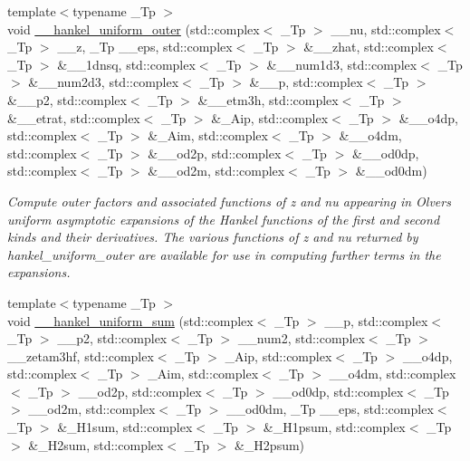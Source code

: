 \begin{DoxyCompactItemize}
{\footnotesize template$<$typename \+\_\+\+Tp $>$ }\\void \hyperlink{namespacestd_1_1____detail_a099751f2a153283d91f19d6efa52117a}{\+\_\+\+\_\+hankel\+\_\+uniform\+\_\+outer} (std\+::complex$<$ \+\_\+\+Tp $>$ \+\_\+\+\_\+nu, std\+::complex$<$ \+\_\+\+Tp $>$ \+\_\+\+\_\+z, \+\_\+\+Tp \+\_\+\+\_\+eps, std\+::complex$<$ \+\_\+\+Tp $>$ \&\+\_\+\+\_\+zhat, std\+::complex$<$ \+\_\+\+Tp $>$ \&\+\_\+\+\_\+1dnsq, std\+::complex$<$ \+\_\+\+Tp $>$ \&\+\_\+\+\_\+num1d3, std\+::complex$<$ \+\_\+\+Tp $>$ \&\+\_\+\+\_\+num2d3, std\+::complex$<$ \+\_\+\+Tp $>$ \&\+\_\+\+\_\+p, std\+::complex$<$ \+\_\+\+Tp $>$ \&\+\_\+\+\_\+p2, std\+::complex$<$ \+\_\+\+Tp $>$ \&\+\_\+\+\_\+etm3h, std\+::complex$<$ \+\_\+\+Tp $>$ \&\+\_\+\+\_\+etrat, std\+::complex$<$ \+\_\+\+Tp $>$ \&\+\_\+\+Aip, std\+::complex$<$ \+\_\+\+Tp $>$ \&\+\_\+\+\_\+o4dp, std\+::complex$<$ \+\_\+\+Tp $>$ \&\+\_\+\+Aim, std\+::complex$<$ \+\_\+\+Tp $>$ \&\+\_\+\+\_\+o4dm, std\+::complex$<$ \+\_\+\+Tp $>$ \&\+\_\+\+\_\+od2p, std\+::complex$<$ \+\_\+\+Tp $>$ \&\+\_\+\+\_\+od0dp, std\+::complex$<$ \+\_\+\+Tp $>$ \&\+\_\+\+\_\+od2m, std\+::complex$<$ \+\_\+\+Tp $>$ \&\+\_\+\+\_\+od0dm)
\begin{DoxyCompactList}\small\item\em Compute outer factors and associated functions of {\ttfamily z} and {\ttfamily nu} appearing in Olver\textquotesingle{}s uniform asymptotic expansions of the Hankel functions of the first and second kinds and their derivatives. The various functions of z and nu returned by {\ttfamily hankel\+\_\+uniform\+\_\+outer} are available for use in computing further terms in the expansions. \end{DoxyCompactList}\item 
{\footnotesize template$<$typename \+\_\+\+Tp $>$ }\\void \hyperlink{namespacestd_1_1____detail_a561dc02bc44b2dba376d6047289563c7}{\+\_\+\+\_\+hankel\+\_\+uniform\+\_\+sum} (std\+::complex$<$ \+\_\+\+Tp $>$ \+\_\+\+\_\+p, std\+::complex$<$ \+\_\+\+Tp $>$ \+\_\+\+\_\+p2, std\+::complex$<$ \+\_\+\+Tp $>$ \+\_\+\+\_\+num2, std\+::complex$<$ \+\_\+\+Tp $>$ \+\_\+\+\_\+zetam3hf, std\+::complex$<$ \+\_\+\+Tp $>$ \+\_\+\+Aip, std\+::complex$<$ \+\_\+\+Tp $>$ \+\_\+\+\_\+o4dp, std\+::complex$<$ \+\_\+\+Tp $>$ \+\_\+\+Aim, std\+::complex$<$ \+\_\+\+Tp $>$ \+\_\+\+\_\+o4dm, std\+::complex$<$ \+\_\+\+Tp $>$ \+\_\+\+\_\+od2p, std\+::complex$<$ \+\_\+\+Tp $>$ \+\_\+\+\_\+od0dp, std\+::complex$<$ \+\_\+\+Tp $>$ \+\_\+\+\_\+od2m, std\+::complex$<$ \+\_\+\+Tp $>$ \+\_\+\+\_\+od0dm, \+\_\+\+Tp \+\_\+\+\_\+eps, std\+::complex$<$ \+\_\+\+Tp $>$ \&\+\_\+\+H1sum, std\+::complex$<$ \+\_\+\+Tp $>$ \&\+\_\+\+H1psum, std\+::complex$<$ \+\_\+\+Tp $>$ \&\+\_\+\+H2sum, std\+::complex$<$ \+\_\+\+Tp $>$ \&\+\_\+\+H2psum)

\end{DoxyCompactItemize}
